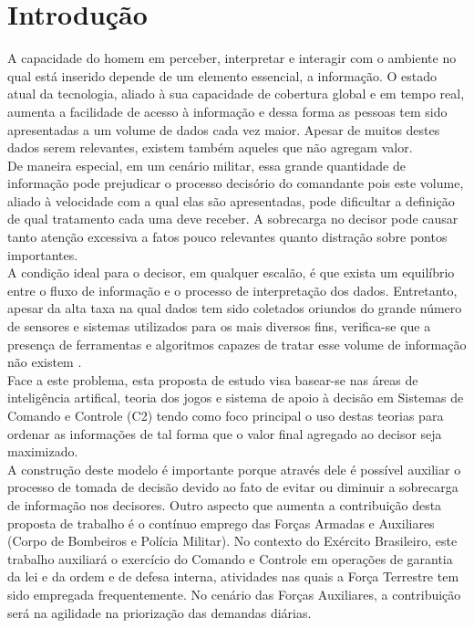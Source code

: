 \documentclass[a4paper,12pt]{article}
\begin{document}
\section{Introdução}
A capacidade do homem em perceber, interpretar e interagir com o ambiente no qual está inserido depende de um elemento essencial, a informação.
O estado atual da tecnologia, aliado à sua capacidade de cobertura global e em tempo real, aumenta a facilidade de acesso à informação e dessa forma as pessoas 
tem sido apresentadas a um volume de dados cada vez maior. Apesar de muitos destes dados serem relevantes, existem também aqueles que não agregam valor.\\
\indent De maneira especial, em um cenário militar, essa grande quantidade de informação pode prejudicar o processo decisório do 
comandante pois este volume, aliado à velocidade com a qual elas são apresentadas, pode dificultar a definição de qual tratamento cada uma deve receber.
A sobrecarga no decisor pode causar tanto atenção excessiva a fatos pouco relevantes quanto distração sobre pontos importantes.\\
\indent A condição ideal para o decisor, em qualquer escalão, é que exista um equilíbrio entre o fluxo de informação e o processo de interpretação dos dados.
Entretanto, apesar da alta taxa na qual dados tem sido coletados oriundos do grande número de sensores e sistemas utilizados para os mais diversos fins, 
verifica-se que a presença de ferramentas e algoritmos capazes de tratar esse volume de informação não existem \cite{Savas 2014}.\\
\indent Face a este problema, esta proposta de estudo visa basear-se nas áreas de inteligência artifical, teoria dos jogos e 
sistema de apoio à decisão em Sistemas de Comando e Controle (C2) tendo como foco principal o uso destas teorias para 
ordenar as informações de tal forma que o valor final agregado ao decisor seja maximizado.\\
\indent A construção deste modelo é importante porque através dele é possível auxiliar o processo de tomada de decisão devido ao fato de evitar ou diminuir 
a sobrecarga de informação nos decisores. Outro aspecto que aumenta a contribuição desta proposta de trabalho é o contínuo emprego das Forças Armadas e 
Auxiliares (Corpo de Bombeiros e Polícia Militar). No contexto do Exército Brasileiro, este trabalho auxiliará o exercício do Comando e Controle em operações 
de garantia da lei e da ordem e de defesa interna, atividades nas quais a Força Terrestre tem sido empregada frequentemente. No cenário das Forças Auxiliares,
a contribuição será na agilidade na priorização das demandas diárias.
\end{document}
